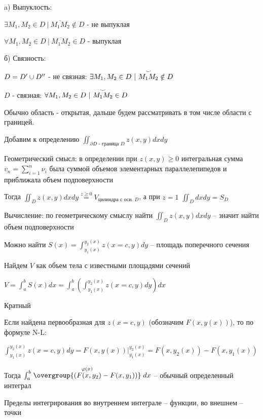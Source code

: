 \documentclass[12pt]{article}
\begin{document}
    a) Выпуклость:

    $\exists M_1, M_2 \in D \ | \ \overline{M_1 M_2} \notin D$ - не выпуклая

    $\forall M_1, M_2 \in D \ | \ \overline{M_1 M_2} \in D$ - выпуклая

    б) Связность:

    $D = D^\prime \cup D^{\prime\prime}$ - не связная: $\exists M_1, M_2 \in D \ | \ \overset{\LARGE\smile}{M_1 M_2} \notin D$

    $D$ - связная: $\forall M_1, M_2 \in D \ | \ \overset{\LARGE\smile}{M_1 M_2} \in D$

    Обычно область - открытая, дальше будем рассматривать в том числе области с границей.

    Добавим к определению $\iint_{\partial D \text{ - граница } D} z(x, y) dx dy$

    Геометрический смысл: в определении при $z(x, y) \geq 0$ интегральная сумма $v_n = \sum_{i=1}^n \nu_i$ была суммой объемов элементарных параллелепипедов и приближала объем подповерхности

    Тогда $\iint_D z(x, y) dx dy \stackrel{z \geq 0}{=} V_{\text{цилиндра с осн. } D}$, а при $z = 1$ $\iint_D dx dy = S_D$

    \hypertarget{doubleintegralcalculation}{}

    Вычисление: по геометрическому смыслу найти $\iint_D z(x, y) dx dy$ -- значит найти объем подповерхности

    Можно найти $S(x) = \int^{y_2(x)}_{y_1(x)} z(x = c, y) dy$ -- площадь поперечного сечения

    Найдем $V$ как объем тела с известными площадями сечений

    $V = \int^b_a S(x) dx = \int_a^b \left(\int^{y_2(x)}_{y_1(x)} z(x = c, y) dy\right) dx$

    \hypertarget{multipleintegral}{}

    \Nota Кратный

    Если найдена первообразная для $z(x = c, y)$ (обозначим $F(x, y(x))$), то по формуле N-L:

    $\int^{y_2(x)}_{y_1(x)} z(x = c, y) dy = F(x, y(x)) \Big|^{y_2(x)}_{y_1(x)} = F(x, y_2(x)) - F(x, y_1(x))$

    Тогда $\int^b_a \stackrel{\varphi(x)}{\overgroup{(F(x, y_2) - F(x, y_1))}} dx$ -- обычный определенный интеграл

    Пределы интегрирования во внутреннем интеграле -- функции, во внешнем -- точки
\end{document}
